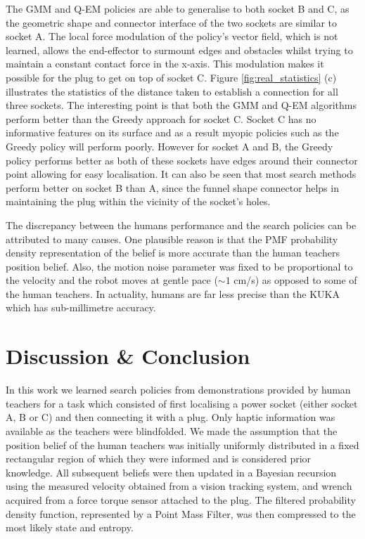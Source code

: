 \documentclass[final,3p,times,twocolumn]{elsarticle}
\begin{document}
The GMM and Q-EM policies are able to generalise to both socket B and C, as the geometric shape and connector interface of the 
two sockets are similar to socket A. The local force modulation of the policy's vector field, which is not learned, allows the 
end-effector to surmount edges and obstacles whilst trying to maintain a constant contact force in the x-axis. This modulation makes it possible for the plug to get on top of socket C.
Figure \ref{fig:real_statistics} (c) illustrates the statistics of the distance taken to establish a connection for all three sockets. 
The interesting point is that both the GMM and Q-EM algorithms perform better than the Greedy approach for socket C. Socket C has no informative 
features on its surface and as a result myopic policies such as the Greedy policy will perform poorly. However for socket A 
and B, the Greedy policy performs better as both of these sockets have edges around their connector point allowing for easy localisation. 
It can also be seen that most search methods perform better on socket B than A, since the funnel shape connector helps in maintaining the plug 
within the vicinity of the socket's holes. 


The discrepancy between the humans performance and the search policies can be attributed to many causes. One plausible reason is 
that the PMF probability density representation of the belief is more accurate than the human teachers position belief. 
Also, the motion noise parameter was fixed to be proportional to the velocity and the robot moves at gentle pace ($\sim1$ cm/s) as 
opposed to some of the human teachers. In actuality, humans are far less precise than the KUKA which has sub-millimetre accuracy.

\section{Discussion \& Conclusion}\label{ch4:conclusion}
%
%
%

In this work we learned search policies from demonstrations provided by human teachers for a task
which consisted of first localising a power socket (either socket A, B or C) and then connecting it with a plug. Only haptic information 
was available as the teachers were blindfolded. We made the assumption that the position belief of the human teachers 
was initially uniformly distributed in a fixed rectangular region of which they were 
informed and is considered prior knowledge. All subsequent beliefs were then updated in a Bayesian recursion 
using the measured velocity obtained from a vision tracking system, and wrench acquired from a force torque sensor attached 
to the plug. The filtered probability density function, represented by a Point Mass Filter, was then compressed to the 
most likely state and entropy.
\end{document}
